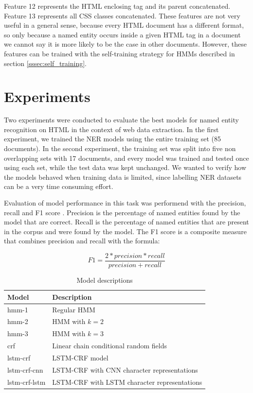 \documentclass{nle}
\begin{document}
Feature 12 represents the HTML enclosing tag and its parent concatenated. Feature 13
represents all CSS classes concatenated. These features are not very useful in a general
sense, because every HTML document has a different format, so only because a named entity
occurs inside a given HTML tag in a document we cannot say it is more likely to be the case 
in other documents. However, these features can be trained with the self-training strategy 
for HMMs described in section \ref{sssec:self_training}. 

\section{Experiments}

Two experiments were conducted to evaluate the best models for named entity recognition
on HTML in the context of web data extraction. In the first experiment, we trained the NER models
using the entire training set (85 documents). In the second experiment, the training set was 
split into five non overlapping sets with 17 documents, and every model was trained
and tested once using each set, while the test data was kept unchanged. We wanted to verify 
how the models behaved when training data is limited, since labelling NER datasets can be a
very time consuming effort.

Evaluation of model performance in this task was performend with the precision, recall and 
F1 score \cite{Rijsbergen1979}. Precision is the percentage of named entities found by 
the model that are correct. Recall is the percentage of named entities that are present
in the corpus and were found by the model. The F1 score is a composite measure that combines
precision and recall with the formula:

\begin{equation}
F1 = \frac{2 * precision * recall}{precision + recall}
\end{equation}

\begin{table}[h]
  \small
  \begin{center}
    \begin{tabular}{ ll }
      \toprule
      Model & Description \\
      \midrule
      hmm-1         & Regular HMM \\
      hmm-2         & HMM with $ k=2 $ \\
      hmm-3         & HMM with $ k=3 $ \\
      crf           & Linear chain conditional random fields \\
      lstm-crf      & LSTM-CRF model \cite{Huang2015} \\
      lstm-crf-cnn  & LSTM-CRF with CNN character representations \cite{Ma2016} \\
      lstm-crf-lstm & LSTM-CRF with LSTM character representations \cite{Lample2016} \\
      \bottomrule
    \end{tabular}
  \end{center}
  \caption{Model descriptions}
  \label{tab:models}
\end{table}
\end{document}
